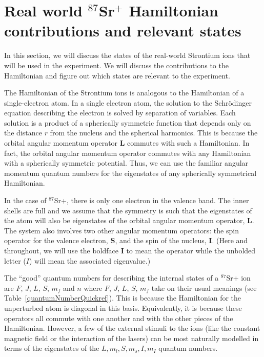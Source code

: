 \section{Real world $^{87}$Sr$^+$ Hamiltonian contributions and relevant states}

In this section, we will discuss the states of the real-world Strontium ions that will be used in the experiment. We will discuss the contributions to the Hamiltonian and figure out which states are relevant to the experiment. 

The Hamiltonian of the Strontium ions is analogous to the Hamiltonian of a single-electron atom. 
In a single electron atom, the solution to the Schr\"odinger equation describing the electron is solved by separation of variables.
 Each solution is a product of a spherically symmetric function that depends only on the distance $r$ from the nucleus and the spherical harmonics.
This is because the orbital angular momentum operator $\mathbf{L}$ commutes with such a Hamiltonian. In fact, the orbital angular momentum operator commutes with any Hamiltonian with a spherically symmetric potential.
Thus, we can use the familiar angular momentum quantum numbers for the eigenstates of any spherically symmetrical Hamiltonian.

In the case of $^{87}$Sr+, there is only one electron in the valence band. The inner shells are full and we assume that the symmetry is such that the eigenstates of the atom will also be eigenstates of the orbital angular momentum operator, $\mathbf{L}$.
 The system also involves two other angular momentum operators: the spin operator for the valence electron, $\mathbf{S}$, %
 and the spin of the nucleus, $\mathbf{I}$. 
(Here and throughout, we will use the boldface $\mathbf{I}$ to mean the operator while the unbolded letter ($I$) will mean the associated eigenvalue.)

The ``good'' quantum numbers for describing the internal states of a $^{87}$Sr+ ion are $F$, $J$, $L$, $S$, $m_f$ and $n$\cite{experimental_hyperfine_alkali_arimondo}\cite{cuaMITnotes} where $F$, $J$, $L$, $S$, $m_f$ take on their usual meanings (see Table\, \ref{quantumNumberQuickref}). This is because the Hamiltonian for the unperturbed atom is diagonal in this basis. Equivalently,  it is because these operators all commute with one another and with the other pieces of the Hamiltonian. However,  a few of the external stimuli to the ions (like the constant magnetic field or the interaction of the lasers) can be most naturally modelled in terms of the eigenstates of the $L, m_l, S, m_s, I, m_I$ quantum numbers.   

